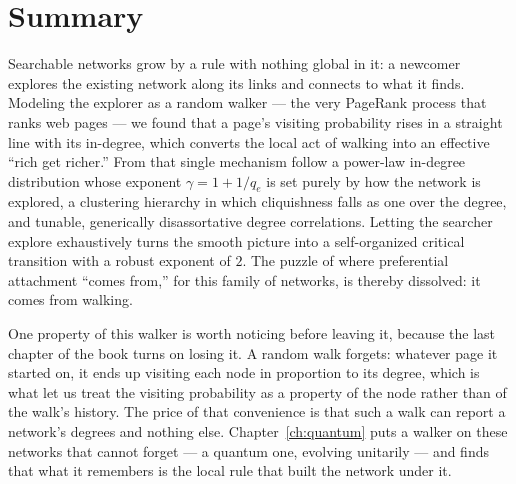 \section{Summary}

Searchable networks grow by a rule with nothing global in it: a newcomer
explores the existing network along its links and connects to what it finds.
Modeling the explorer as a random walker --- the very PageRank process that ranks
web pages --- we found that a page's visiting probability rises in a straight line
with its in-degree, which converts the local act of walking into an effective
``rich get richer.'' From that single mechanism follow a power-law in-degree
distribution whose exponent $\gamma=1+1/q_e$ is set purely by how the network is
explored, a clustering hierarchy in which cliquishness falls as one over the
degree, and tunable, generically disassortative degree correlations. Letting the
searcher explore exhaustively turns the smooth picture into a self-organized
critical transition with a robust exponent of $2$. The puzzle of where
preferential attachment ``comes from,'' for this family of networks, is thereby
dissolved: it comes from walking.

One property of this walker is worth noticing before leaving it, because the last
chapter of the book turns on losing it. A random walk forgets: whatever page it
started on, it ends up visiting each node in proportion to its degree, which is what
let us treat the visiting probability as a property of the node rather than of the
walk's history. The price of that convenience is that such a walk can report a
network's degrees and nothing else. Chapter~\ref{ch:quantum} puts a walker on these
networks that cannot forget --- a quantum one, evolving unitarily --- and finds that
what it remembers is the local rule that built the network under it.
